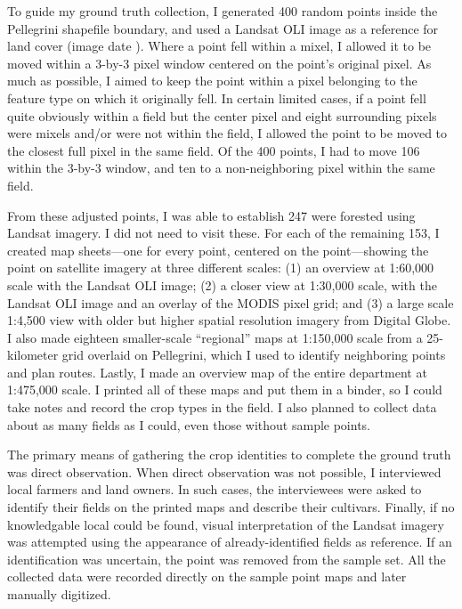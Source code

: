 To guide my ground truth collection, I generated 400 random points inside the Pellegrini shapefile boundary, and used a Landsat OLI image as a reference for land cover (image date ). Where a point fell within a mixel, I allowed it to be moved within a 3-by-3 pixel window centered on the point's original pixel. As much as possible, I aimed to keep the point within a pixel belonging to the feature type on which it originally fell. In certain limited cases, if a point fell quite obviously within a field but the center pixel and eight surrounding pixels were mixels and/or were not within the field, I allowed the point to be moved to the closest full pixel in the same field. Of the 400 points, I had to move 106 within the 3-by-3 window, and ten to a non-neighboring pixel within the same field.

From these adjusted points, I was able to establish 247 were forested using Landsat imagery. I did not need to visit these. For each of the remaining 153, I created map sheets---one for every point, centered on the point---showing the point on satellite imagery at three different scales: (1) an overview at 1:60,000 scale with the  Landsat OLI image; (2) a closer view at 1:30,000 scale, with the Landsat OLI image and an overlay of the MODIS pixel grid; and (3) a large scale 1:4,500 view with older but higher spatial resolution imagery from Digital Globe. I also made eighteen smaller-scale ``regional'' maps at 1:150,000 scale from a 25-kilometer grid overlaid on Pellegrini, which I used to identify neighboring points and plan routes. Lastly, I made an overview map of the entire department at 1:475,000 scale. I printed all of these maps and put them in a binder, so I could take notes and record the crop types in the field. I also planned to collect data about as many fields as I could, even those without sample points.
 
The primary means of gathering the crop identities to complete the ground truth was direct observation. When direct observation was not possible, I interviewed local farmers and land owners. In such cases, the interviewees were asked to identify their fields on the printed maps and describe their cultivars. Finally, if no knowledgable local could be found, visual interpretation of the Landsat imagery was attempted using the appearance of already-identified fields as reference. If an identification was uncertain, the point was removed from the sample set. All the collected data were recorded directly on the sample point maps and later manually digitized.

